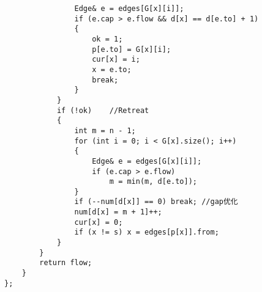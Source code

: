 \documentclass[a4]{article}
\begin{document}
\begin{lstlisting}
                Edge& e = edges[G[x][i]];
                if (e.cap > e.flow && d[x] == d[e.to] + 1)
                {
                    ok = 1;
                    p[e.to] = G[x][i];
                    cur[x] = i;
                    x = e.to;
                    break;
                }
            }
            if (!ok)    //Retreat
            {
                int m = n - 1;
                for (int i = 0; i < G[x].size(); i++)
                {
                    Edge& e = edges[G[x][i]];
                    if (e.cap > e.flow)
                        m = min(m, d[e.to]);
                }
                if (--num[d[x]] == 0) break; //gap优化
                num[d[x] = m + 1]++;
                cur[x] = 0;
                if (x != s) x = edges[p[x]].from;
            }
        }
        return flow;
    }
};
\end{lstlisting}
\end{document}
